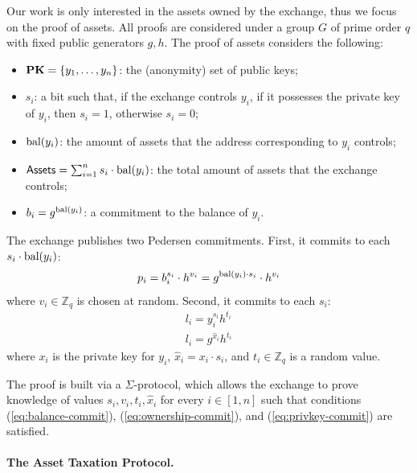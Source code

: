 Our work is only interested in the assets owned by the exchange, thus we focus
on the proof of assets. All proofs are considered under a group
$G$ of prime order $q$ with fixed public generators $g, h$. The proof of assets
considers the following:
\begin{itemize}
    \item $\text{\textbf{PK}} = \{y_1, \dots, y_n \}$: the (anonymity) set of public keys;
    \item $s_i$: a bit such that, if the exchange controls $y_i$, \ie if it possesses the private key of $y_i$, then $s_i = 1$, otherwise $s_i = 0$;
    \item $\text{bal}(y_i)$: the amount of assets that the address corresponding to $y_i$ controls;
    \item $\mathsf{Assets} = \sum_{i = 1}^n s_i \cdot \text{bal}(y_i)$: the total amount of assets that the exchange controls;
    \item $b_i = g^{\text{bal}(y_i)}$: a commitment to the balance of $y_i$.
\end{itemize}

The exchange publishes two Pedersen commitments. First, it commits to each $s_i
\cdot \text{bal}(y_i)$:
\begin{align}
    p_i = b_i^{s_i} \cdot h^{v_i} = g^{\text{bal}(y_i) \cdot s_i} \cdot h^{v_i} \label{eq:balance-commit}
\end{align}
where $v_i \in \mathbb{Z}_q$ is chosen at random.
Second, it commits to each $s_i$:
\begin{align}
    l_i = y_i^{s_i}h^{t_i} \label{eq:ownership-commit} \\
    l_i = g^{\hat{x}_i}h^{t_i} \label{eq:privkey-commit}
\end{align}
where $x_i$ is the private key for $y_i$, $\hat{x}_i = x_i \cdot s_i$, and $t_i
\in \mathbb{Z}_q$ is a random value.

The proof is built via a $\Sigma$-protocol, which allows the exchange to prove
knowledge of values $s_i, v_i, t_i, \hat{x}_i$ for every $i \in [1, n]$ such
that conditions (\ref{eq:balance-commit}), (\ref{eq:ownership-commit}), and
(\ref{eq:privkey-commit}) are satisfied.

\paragraph{The Asset Taxation Protocol.}\label{subsec:tax-authority-proto}

